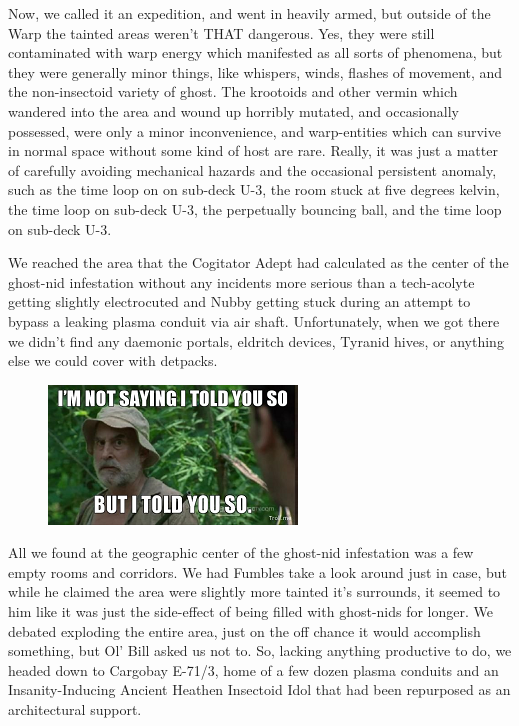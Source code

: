 Now, we called it an expedition, and went in heavily armed, but outside of the Warp the tainted areas weren't THAT dangerous. 
Yes, they were still contaminated with warp energy which manifested as all sorts of phenomena, but they were generally minor things, like whispers, winds, flashes of movement, and the non-insectoid variety of ghost. 
The krootoids and other vermin which wandered into the area and wound up horribly mutated, and occasionally possessed, were only a minor inconvenience, and warp-entities which can survive in normal space without some kind of host are rare. 
Really, it was just a matter of carefully avoiding mechanical hazards and the occasional persistent anomaly, such as the time loop on on sub-deck U-3, the room stuck at five degrees kelvin, the time loop on sub-deck U-3, the perpetually bouncing ball, and the time loop on sub-deck U-3. 


We reached the area that the Cogitator Adept had calculated as the center of the ghost-nid infestation without any incidents more serious than a tech-acolyte getting slightly electrocuted and Nubby getting stuck during an attempt to bypass a leaking plasma conduit via air shaft. 
Unfortunately, when we got there we didn't find any daemonic portals, eldritch devices, Tyranid hives, or anything else we could cover with detpacks.

\begin{figure}
	\begin{center}
		\includegraphics[width=\figwidth]{pics/15/23.png}
	\end{center}
\end{figure}
All we found at the geographic center of the ghost-nid infestation was a few empty rooms and corridors. 
We had Fumbles take a look around just in case, but while he claimed the area were slightly more tainted it's surrounds, it seemed to him like it was just the side-effect of being filled with ghost-nids for longer. 
We debated exploding the entire area, just on the off chance it would accomplish something, but Ol' Bill asked us not to. 
So, lacking anything productive to do, we headed down to Cargobay E-71/3, home of a few dozen plasma conduits and an Insanity-Inducing Ancient Heathen Insectoid Idol that had been repurposed as an architectural support.

